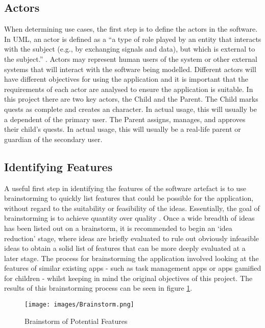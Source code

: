 \subsection{Actors}
When determining use cases, the first step is to define the actors in the software.
In UML, an actor is defined as a ``a type of role played by an entity that interacts with the subject (e.g., by exchanging signals and data), but which is external to the subject.'' \citep[p586-588]{omg2007unified}.
Actors may represent human users of the system or other external systems that will interact with the software being modelled.
Different actors will have different objectives for using the application and it is important that the requirements of each actor are analysed to ensure the application is suitable. 
In this project there are two key actors, the Child and the Parent. 
The Child marks quests as complete and creates an character. In actual usage, this will usually be a dependent of the primary user. 
The Parent assigns, manages, and approves their child's quests. In actual usage, this will usually be a real-life parent or guardian of the secondary user.

\subsection{Identifying Features}
A useful first step in identifying the features of the software artefact is to use brainstorming to quickly list features that could be possible for the application, without regard to the suitability or feasibility of the ideas.
Essentially, the goal of brainstorming is to achieve quantity over quality \citep[p.144]{leffingwell2000managing}.
Once a wide breadth of ideas has been listed out on a brainstorm, it is recommended to begin an `idea reduction' stage, where ideas are briefly evaluated to rule out obviously infeasible ideas to obtain a solid list of features that can be more deeply evaluated at a later stage.
The process for brainstorming the application involved looking at the features of similar existing apps - such as task management apps or apps gamified for children - whilst keeping in mind the original objectives of this project.
The results of this brainstorming process can be seen in figure \ref{fig:brainstorm}.

\begin{figure}[ht]
	\centering
	\texttt{[image: images/Brainstorm.png]}
	\caption{Brainstorm of Potential Features}
	\label{fig:brainstorm}
\end{figure} 

